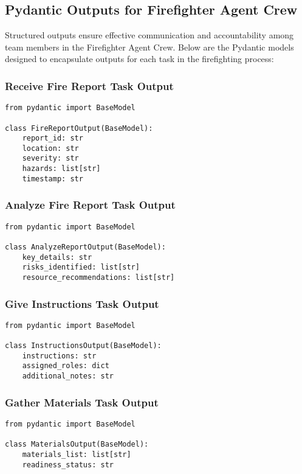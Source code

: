 \subsection{Pydantic Outputs for Firefighter Agent Crew}

Structured outputs ensure effective communication and accountability among team members in the Firefighter Agent Crew. Below are the Pydantic models designed to encapsulate outputs for each task in the firefighting process:

\subsubsection{Receive Fire Report Task Output}
\begin{lstlisting}[caption={Pydantic model for Receive Fire Report Task Output}]
from pydantic import BaseModel

class FireReportOutput(BaseModel):
    report_id: str
    location: str
    severity: str
    hazards: list[str]
    timestamp: str
\end{lstlisting}

\subsubsection{Analyze Fire Report Task Output}
\begin{lstlisting}[caption={Pydantic model for Analyze Fire Report Task Output}]
from pydantic import BaseModel

class AnalyzeReportOutput(BaseModel):
    key_details: str
    risks_identified: list[str]
    resource_recommendations: list[str]
\end{lstlisting}

\subsubsection{Give Instructions Task Output}
\begin{lstlisting}[caption={Pydantic model for Give Instructions Task Output}]
from pydantic import BaseModel

class InstructionsOutput(BaseModel):
    instructions: str
    assigned_roles: dict
    additional_notes: str
\end{lstlisting}

\subsubsection{Gather Materials Task Output}
\begin{lstlisting}[caption={Pydantic model for Gather Materials Task Output}]
from pydantic import BaseModel

class MaterialsOutput(BaseModel):
    materials_list: list[str]
    readiness_status: str
\end{lstlisting}


